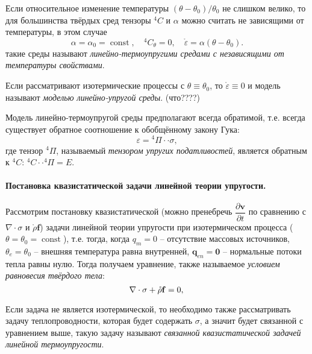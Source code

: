 Если относительное изменение температуры $(\theta - \theta_0) / \theta_0$ не слишком велико,
то для большинства твёрдых сред тензоры ${}^4 C$ и $\alpha$ можно считать не зависящими
от температуры, в этом случае
\[
  \alpha = \alpha_0 = \operatorname{const}, \quad {}^4 C_\theta = 0, \quad \mathring{\varepsilon} = \alpha ( \theta - \theta_0 ).
\]
такие среды называют \emph{линейно-термоупругими средами с независящими от температуры свойствами}.

Если рассматривают изотермические процессы с $\theta \equiv \theta_0$, то
$\mathring{\varepsilon} \equiv 0$ и модель называют \emph{моделью линейно-упругой среды}.
(что????)

Модель линейно-термоупругой среды предполагают всегда обратимой, т.е. всегда существует
обратное соотношение к обобщённому закону Гука:
\[
  \varepsilon = {}^4 \Pi \cdot\cdot \sigma,
\]
где тензор ${}^4 \Pi$, называемый \emph{тензором упругих податливостей}, является обратным 
к ${}^4 C$: ${}^4 C \cdot\cdot {}^4 \Pi = E$.

\paragraph{Постановка квазистатической задачи линейной теории упругости.}

Рассмотрим постановку квазистатической (можно пренебречь
$ \dfrac{\partial \mathbf{v}}{\partial t} $ по сравнению с $\nabla \cdot \sigma$ и
$\mathring{\rho} \mathbf{f}$) задачи линейной теории упругости при изотермическом процесса
($\theta = \theta_0 = \operatorname{const}$), т.е. тогда, когда $q_m = 0$ -- отсутствие массовых
источников, $\theta_e = \theta_0$ -- внешняя температура равна внутренней,
$\mathbf{q}_{en} = \mathbf{0}$ -- нормальные потоки тепла равны нулю. Тогда получаем уравнение,
также называемое \emph{условием равновесия твёрдого тела}:
\[
  \nabla \cdot \sigma + \mathring{\rho} \mathbf{f} = 0, \\
\]

Если задача не является изотермической, то необходимо также рассматривать задачу теплопроводности,
которая будет содержать $\sigma$, а значит будет связанной с уравнением выше, такую задачу
называют \emph{связанной квазистатической задачей линейной термоупругости}.

